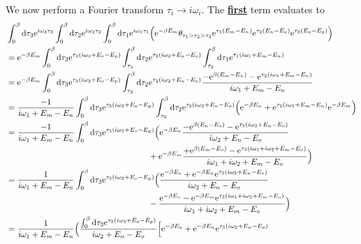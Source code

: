\documentclass[12pt,a4paper]{scrartcl}
\numberwithin{equation}{section}
\renewcommand{\exp}[1]{\mathrm{e}^{#1}}
\begin{document}
%
%
We now perform a Fourier transform $\tau_i \rightarrow i\omega_i$. The \textbf{\underline{first}} term evaluates to
\begin{align}
 &\int_0^{\beta} \mathrm{d}\tau_3 \exp{i\omega_3 \tau_3} 
 \int_0^{\beta} \mathrm{d}\tau_2 \exp{i\omega_2 \tau_2}
 \int_0^{\beta} \mathrm{d}\tau_1 \exp{i\omega_1 \tau_1}
 \Big( \exp{-\beta E_m}\theta_{\tau_1 > \tau_2 > \tau_3} \exp{\tau_1(E_m-E_n)}\exp{\tau_2(E_n-E_o)}\exp{\tau_3(E_o-E_p)} \Big) \\
 &= \exp{-\beta E_m}
 \int_0^{\beta} \mathrm{d}\tau_3 \exp{\tau_3( i\omega_3 +E_o-E_p) } 
 \int_{\tau_3}^{\beta} \mathrm{d}\tau_2 \exp{\tau_2( i\omega_2 + E_n-E_o) }
 \int_{\tau_2}^{\beta} \mathrm{d}\tau_1 \exp{\tau_1( i\omega_1 + E_m-E_n) } \\
% 
 &= \exp{-\beta E_m}
 \int_0^{\beta} \mathrm{d}\tau_3 \exp{\tau_3( i\omega_3 +E_o-E_p) } 
 \int_{\tau_3}^{\beta} \mathrm{d}\tau_2 \exp{\tau_2( i\omega_2 + E_n-E_o) }
 \frac{-\exp{\beta(E_m-E_n)} - \exp{\tau_2( i\omega_1 + E_m-E_n) }}{i\omega_1 +E_m-E_n} \\
 &= 
 \frac{-1}{i\omega_1 +E_m-E_n}
 \int_0^{\beta} \mathrm{d}\tau_3 \exp{\tau_3( i\omega_3 +E_o-E_p) } 
 \int_{\tau_3}^{\beta} \mathrm{d}\tau_2 \exp{\tau_2( i\omega_2 + E_n-E_o) }
 \Big( \exp{-\beta E_n} + \exp{\tau_2( i\omega_1 + E_m-E_n) }\exp{-\beta E_m} \Big) \\
 &= 
 \frac{-1}{i\omega_1 +E_m-E_n}
 \int_0^{\beta} \mathrm{d}\tau_3 \exp{\tau_3( i\omega_3 +E_o-E_p) } 
 \Big(
 \exp{-\beta E_n} \frac{-\exp{\beta(E_n-E_o)} - \exp{\tau_3( i\omega_2 + E_n-E_o) }}{i\omega_2 +E_n-E_o} \nonumber \\
 & \hspace*{6cm} + \exp{-\beta E_m} \frac{+\exp{\beta(E_m-E_o)} - \exp{\tau_3(i\omega_1+ i\omega_2 + E_m-E_o) }}{i\omega_1+ i\omega_2 + E_m-E_o}
 \Big)  \\
 &= 
 \frac{1}{i\omega_1 +E_m-E_n}
 \int_0^{\beta} \mathrm{d}\tau_3 \exp{\tau_3( i\omega_3 +E_o-E_p) } 
 \Big(
 \frac{\exp{-\beta E_o} + \exp{-\beta E_n}\exp{\tau_3( i\omega_2 + E_n-E_o) }}{i\omega_2 +E_n-E_o} \nonumber \\
 & \hspace*{6cm} -  \frac{\exp{-\beta E_o} - \exp{-\beta E_m}\exp{\tau_3(i\omega_1+ i\omega_2 + E_m-E_o) }}{i\omega_1+ i\omega_2 + E_m-E_o}
 \Big)  \\
 &= 
 \frac{1}{i\omega_1 +E_m-E_n}
 \Big( \frac{\int_0^{\beta} \mathrm{d}\tau_3 \exp{\tau_3( i\omega_3 +E_o-E_p) } }{i\omega_2 +E_n-E_o}
 \Big[
 \exp{-\beta E_o} + \exp{-\beta E_n}\exp{\tau_3( i\omega_2 + E_n-E_o) } 

\end{align}
\end{document}
